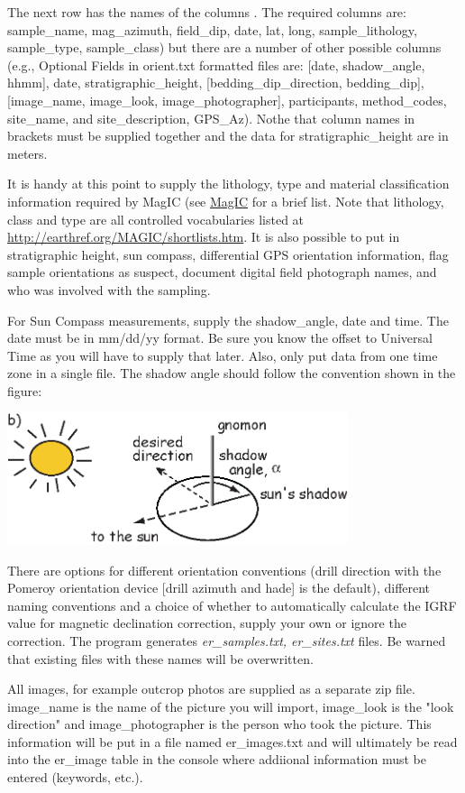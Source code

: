 \documentclass[11pt]{book}
\begin{document}
{{ The next row has the names of the columns .  The required columns are:  sample\_name, mag\_azimuth, field\_dip, date, lat, long, sample\_lithology, sample\_type, sample\_class) but there are a number of other possible columns (e.g., Optional Fields in orient.txt formatted files are: [date, shadow_angle, hhmm], date, stratigraphic_height, [bedding_dip_direction, bedding_dip], [image_name, image_look, image_photographer], participants, method_codes, site_name, and site_description, GPS_Az).  Nothe that column names in brackets must be supplied together and the data for stratigraphic_height are in meters. 
 
   It is handy at this point to supply the lithology, type and material classification information required by MagIC (see \href{#MagIC}{MagIC} for a brief list. Note that lithology, class and type are all controlled vocabularies listed at \url{http://earthref.org/MAGIC/shortlists.htm}.   It is also possible to put in stratigraphic height, sun compass, differential GPS orientation information, flag sample orientations as suspect, document digital field photograph names, and who was involved with the sampling.  
 
 For Sun Compass measurements, supply the shadow_angle, date and time. The date must be in mm/dd/yy format. Be sure you know the offset to Universal Time as you will have to supply that later. Also, only put data from one time zone in a single file. The shadow angle should follow the convention shown in the figure:
 
  \includegraphics[width=10cm]{EPSfiles/suncomp.eps}
  
  There are options for 
 different orientation conventions (drill direction with the Pomeroy orientation device  [drill azimuth and hade] is the default), different naming conventions and a choice of whether to automatically calculate the IGRF value for magnetic declination correction, supply your own or ignore the correction.  The program generates {\it er\_samples.txt, er\_sites.txt} files.  Be warned that existing files with these names will be overwritten.   
 
 All images, for example outcrop photos are supplied as a separate zip file. image_name is the name of the picture you will import, image_look is the "look direction" and image_photographer is the person who took the picture. This information will be put in a file named er_images.txt and will ultimately be read into the er_image table in the console where addiional information must be entered (keywords, etc.).

}}
\end{document}
